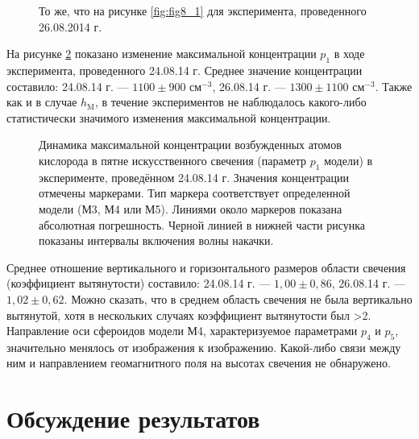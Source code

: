 \documentclass[12pt,a4paper]{article}
\begin{document}
\begin{figure}[h]
	\caption{То же, что на рисунке \ref{fig:fig8_1} для эксперимента, проведенного 26.08.2014 г.}
	\label{fig:fig8_2}
\end{figure}	

На рисунке \ref{fig:fig9_1} показано изменение максимальной концентрации $p_1$ в ходе эксперимента, проведенного 24.08.14 г. Среднее значение концентрации составило: 24.08.14 г. --- $1100\pm900$ см$^{-3}$, 26.08.14 г. --- $1300\pm1100$ см$^{-3}$. Также как и в случае $h_\text{M}$, в течение экспериментов не наблюдалось какого-либо статистически значимого изменения максимальной концентрации.

\begin{figure}[h]
	\caption{Динамика максимальной концентрации возбужденных атомов кислорода в пятне искусственного свечения (параметр $p_1$ модели) в эксперименте, проведённом 24.08.14 г. Значения концентрации отмечены маркерами. Тип маркера соответствует определенной модели (М3, М4 или М5). Линиями около маркеров показана абсолютная погрешность. Черной линией в нижней части рисунка показаны интервалы включения волны накачки.}
	\label{fig:fig9_1}
\end{figure}

Среднее отношение вертикального и горизонтального размеров области свечения (коэффициент вытянутости) составило: 24.08.14 г. --- $1,00\pm0,86$, 26.08.14 г. --- $1,02\pm0,62$. Можно сказать, что в среднем область свечения не была вертикально вытянутой, хотя в нескольких случаях коэффициент вытянутости был >2. Направление оси сфероидов модели М4, характеризуемое параметрами $p_4$ и $p_5$, значительно менялось от изображения к изображению. Какой-либо связи между ним и направлением геомагнитного поля на высотах свечения не обнаружено. 

\section{Обсуждение результатов} \label{sec:discuss}
\end{document}
